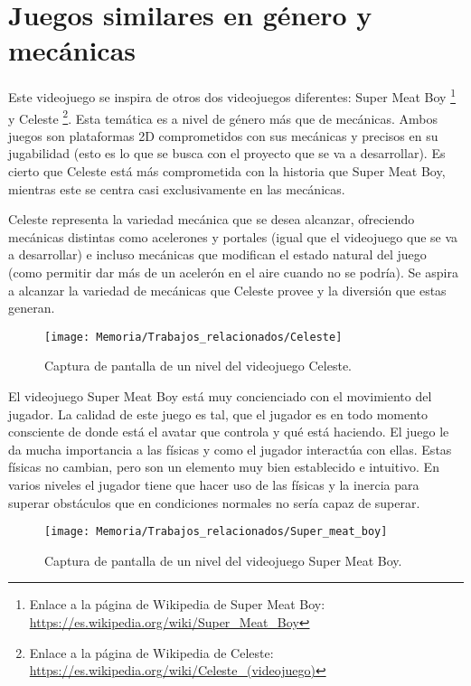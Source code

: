 
\section{Juegos similares en género y mecánicas}
Este videojuego se inspira de otros dos videojuegos diferentes: Super Meat Boy \footnote{Enlace a la página de Wikipedia de Super Meat Boy: \url{https://es.wikipedia.org/wiki/Super_Meat_Boy}} y Celeste 
\footnote{Enlace a la página de Wikipedia de Celeste: \url{https://es.wikipedia.org/wiki/Celeste_(videojuego)}}. Esta temática es a nivel de género más que de mecánicas. Ambos juegos son plataformas 2D comprometidos con sus mecánicas y precisos en su jugabilidad (esto es lo que se busca con el proyecto que se va a desarrollar). Es cierto que Celeste está más comprometida con la historia que Super Meat Boy, mientras este se centra casi exclusivamente en las mecánicas.

Celeste representa la variedad mecánica que se desea alcanzar, ofreciendo mecánicas distintas como acelerones y portales (igual que el videojuego que se va a desarrollar) e incluso mecánicas que modifican el estado natural del juego (como permitir dar más de un acelerón en el aire cuando no se podría). Se aspira a alcanzar la variedad de mecánicas que Celeste provee y la diversión que estas generan.

\clearpage
\begin{figure}[h]
\centering
\texttt{[image: Memoria/Trabajos\_relacionados/Celeste]}
\caption{Captura de pantalla de un nivel del videojuego Celeste.}
\end{figure}

El videojuego Super Meat Boy está muy concienciado con el movimiento del jugador. La calidad de este juego es tal, que el jugador es en todo momento consciente de donde está el avatar que controla y qué está haciendo. El juego le da mucha importancia a las físicas y como el jugador interactúa con ellas. Estas físicas no cambian, pero son un elemento muy bien establecido e intuitivo. En varios niveles el jugador tiene que hacer uso de las físicas y la inercia para superar obstáculos que en condiciones normales no sería capaz de superar.

\begin{figure}[h]
\centering
\texttt{[image: Memoria/Trabajos\_relacionados/Super\_meat\_boy]}
\caption{Captura de pantalla de un nivel del videojuego Super Meat Boy.}
\end{figure}

